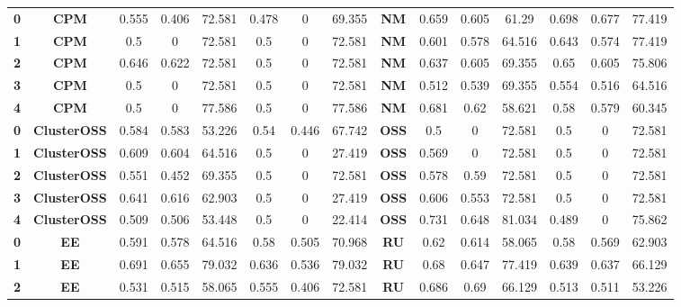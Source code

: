 {{\begin{tabular}{c|c|cccccc|ccccccc}
\textbf{0} & \textbf{CPM} & 0.555 & 0.406 & 72.581 & 0.478 & 0     & 69.355 & \multicolumn{1}{c|}{\textbf{NM}} & 0.659 & 0.605 & 61.29 & 0.698 & 0.677 & 77.419 \\
\textbf{1} & \textbf{CPM} & 0.5   & 0     & 72.581 & 0.5   & 0     & 72.581 & \multicolumn{1}{c|}{\textbf{NM}} & 0.601 & 0.578 & 64.516 & 0.643 & 0.574 & 77.419 \\
\textbf{2} & \textbf{CPM} & 0.646 & 0.622 & 72.581 & 0.5   & 0     & 72.581 & \multicolumn{1}{c|}{\textbf{NM}} & 0.637 & 0.605 & 69.355 & 0.65  & 0.605 & 75.806 \\
\textbf{3} & \textbf{CPM} & 0.5   & 0     & 72.581 & 0.5   & 0     & 72.581 & \multicolumn{1}{c|}{\textbf{NM}} & 0.512 & 0.539 & 69.355 & 0.554 & 0.516 & 64.516 \\
\textbf{4} & \textbf{CPM} & 0.5   & 0     & 77.586 & 0.5   & 0     & 77.586 & \multicolumn{1}{c|}{\textbf{NM}} & 0.681 & 0.62  & 58.621 & 0.58  & 0.579 & 60.345 \\
\textbf{0} & \textbf{ClusterOSS} & 0.584 & 0.583 & 53.226 & 0.54  & 0.446 & 67.742 & \multicolumn{1}{c|}{\textbf{OSS}} & 0.5   & 0     & 72.581 & 0.5   & 0     & 72.581 \\
\textbf{1} & \textbf{ClusterOSS} & 0.609 & 0.604 & 64.516 & 0.5   & 0     & 27.419 & \multicolumn{1}{c|}{\textbf{OSS}} & 0.569 & 0     & 72.581 & 0.5   & 0     & 72.581 \\
\textbf{2} & \textbf{ClusterOSS} & 0.551 & 0.452 & 69.355 & 0.5   & 0     & 72.581 & \multicolumn{1}{c|}{\textbf{OSS}} & 0.578 & 0.59  & 72.581 & 0.5   & 0     & 72.581 \\
\textbf{3} & \textbf{ClusterOSS} & 0.641 & 0.616 & 62.903 & 0.5   & 0     & 27.419 & \multicolumn{1}{c|}{\textbf{OSS}} & 0.606 & 0.553 & 72.581 & 0.5   & 0     & 72.581 \\
\textbf{4} & \textbf{ClusterOSS} & 0.509 & 0.506 & 53.448 & 0.5   & 0     & 22.414 & \multicolumn{1}{c|}{\textbf{OSS}} & 0.731 & 0.648 & 81.034 & 0.489 & 0     & 75.862 \\
\textbf{0} & \textbf{EE} & 0.591 & 0.578 & 64.516 & 0.58  & 0.505 & 70.968 & \multicolumn{1}{c|}{\textbf{RU}} & 0.62  & 0.614 & 58.065 & 0.58  & 0.569 & 62.903 \\
\textbf{1} & \textbf{EE} & 0.691 & 0.655 & 79.032 & 0.636 & 0.536 & 79.032 & \multicolumn{1}{c|}{\textbf{RU}} & 0.68  & 0.647 & 77.419 & 0.639 & 0.637 & 66.129 \\
\textbf{2} & \textbf{EE} & 0.531 & 0.515 & 58.065 & 0.555 & 0.406 & 72.581 & \multicolumn{1}{c|}{\textbf{RU}} & 0.686 & 0.69  & 66.129 & 0.513 & 0.511 & 53.226 \\

\end{tabular}}}
